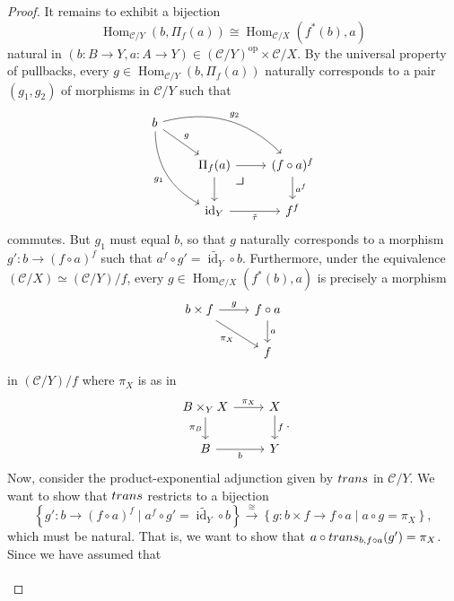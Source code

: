 \documentclass[10pt,letterpaper,cm]{nupset}
\theoremstyle{definition}
\theoremstyle{theorem}
\theoremstyle{remark}
\newcommand{\0}{\mathbf{0}}
\newcommand{\1}{\mathbf{1}}
\newcommand{\2}{\mathbf{2}}
\DeclareMathOperator{\op}{op}
\renewcommand{\c}{\mathscr{C}}
\DeclareMathOperator{\Hom}{Hom}
\DeclareMathOperator{\idd}{id}
\DeclareMathOperator{\trans}{\mathnormal{trans}}
\begin{document}
\begin{proof}
\smallskip
It remains to exhibit a bijection $$\Hom_{\c/Y}\left(b, \Pi_f(a)\right) \cong \Hom_{\c/X}\left(f^{\ast}(b), a\right)$$ natural in  $\left(b: B \to Y, a:A \to Y\right) \in \left(\c/Y\right)^{\op} \times \c/X$. By the universal property of pullbacks, every $g\in \Hom_{\c/Y}(b, \Pi_f(a))$ naturally corresponds  to a pair $\left(g_1, g_2\right)$ of morphisms in $\c/Y$ such that
\[
\begin{tikzcd}
b \arrow[rd, "g"] \arrow[rdd, "g_1"', bend right] \arrow[rrd, "g_2", bend left] &                                         &                               \\
                                                                           & \Pi_f(a) \arrow[d] \arrow[r]  
\arrow[dr, phantom, "\scalebox{1.5}{\color{black}$\lrcorner$}" , very near start, color=black]
          & (f\circ a)^f \arrow[d, "a^f"] \\
                                                                           & \idd_Y \arrow[r, "\tilde{\tau}"'] & f^f                          
\end{tikzcd}
\]
commutes. But $g_1$ must equal $b$, so that $g$ naturally corresponds to a morphism $g' : b \to \left(f\circ a\right)^f$ such that $a^f \circ g' = \widetilde{\idd_Y} \circ b$.
Furthermore, under the equivalence $\left(\c/X\right) \simeq \left(\c/Y\right)/f$, every $g \in \Hom_{\c/X}(f^{\ast}(b), a)$ is precisely a morphism
\[
\begin{tikzcd}
b\times f \arrow[r, "g"] \arrow[rd, "\pi_X"'] & f\circ a \arrow[d, "a"] \\
                                              & f                      
\end{tikzcd}
\]
in $\left(\c/Y\right)/f$ where $\pi_X$ is as in
\[
\begin{tikzcd}
B\times_Y X \arrow[d, "\pi_B"'] \arrow[r, "\pi_X"] & X\arrow[d, "f"] \\
B \arrow[r, "b"']                         & Y               
\end{tikzcd}
.\]  Now, consider the product-exponential adjunction given by $\trans$ in $\c/Y$. We want to show that $\trans$ restricts to a bijection $$\left\{g' : b \to \left(f\circ a\right)^f \mid a^f \circ g' = \widetilde{\idd_Y} \circ b\right\} \overset{\cong}{\longrightarrow} \left\{g : b \times f \to f \circ a \mid a \circ g = \pi_X\right\},$$ which must be natural. That is, we want to show that $a \circ \trans_{b, f\circ a}(g') = \pi_X$. Since we have assumed that 
\[
\begin{tikzcd}

\end{tikzcd}\]
\end{proof}
\end{document}
